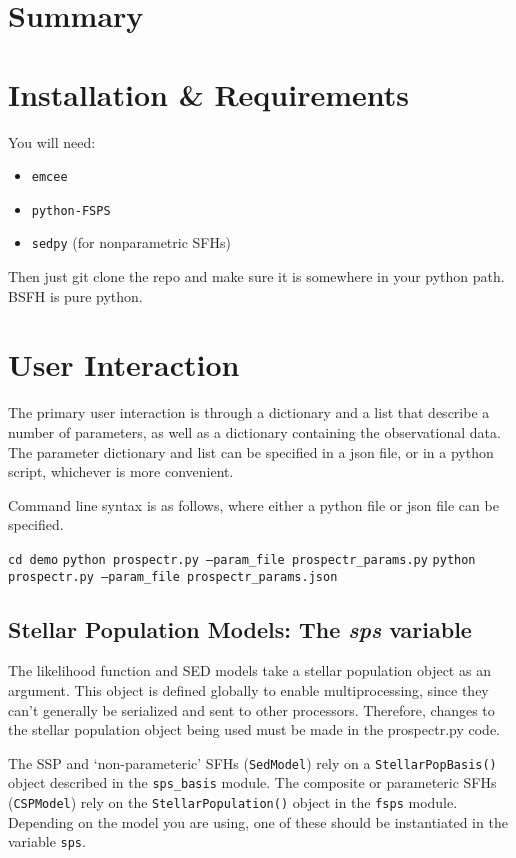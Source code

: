 

\section{Summary}

\section{Installation \& Requirements}
You will need:

\begin{itemize}
\item \texttt{emcee}
\item \texttt{python-FSPS}
\item \texttt{sedpy} (for nonparametric SFHs)
\end{itemize}

Then just git clone the repo and make sure it is somewhere in your
python path.  BSFH is pure python.

\section{User Interaction}
The primary user interaction is through a dictionary and a list that
describe a number of parameters, as well as a dictionary containing
the observational data.  The parameter dictionary and list can be
specified in a json file, or in a python script, whichever is more
convenient.

Command line syntax is as follows, where either a python file or json
file can be specified.
\begin{center}
\texttt{cd demo}
\texttt{python prospectr.py --param_file prospectr_params.py}
\texttt{python prospectr.py --param_file prospectr_params.json}
\end{center}

\subsection{Stellar Population Models: The \emph{sps} variable}
The likelihood function and SED models take a stellar population object
as an argument.  This object is defined globally to enable
multiprocessing, since they can't generally be serialized and sent to
other processors.  Therefore, changes to the stellar population object
being used must be made in the prospectr.py code.

The SSP and `non-parameteric' SFHs (\texttt{SedModel}) rely on a
\texttt{StellarPopBasis()} object described in the \texttt{sps_basis}
module.  The composite or parameteric SFHs (\texttt{CSPModel}) rely on
the \texttt{StellarPopulation()} object in the \texttt{fsps} module.
Depending on the model you are using, one of these should be
instantiated in the variable \texttt{sps}.

